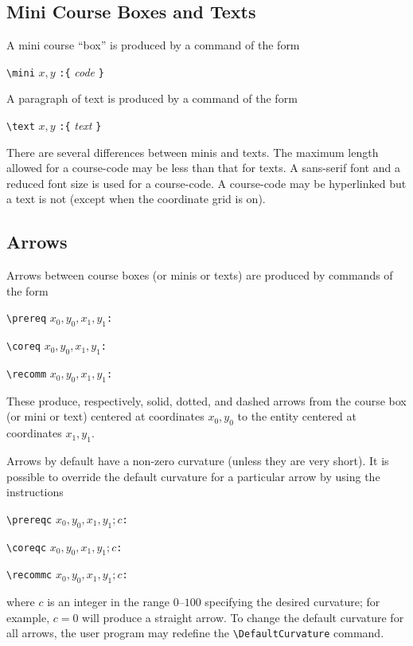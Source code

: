\documentclass[11pt]{article}
\begin{document}
\subsection{Mini Course Boxes and Texts}
A mini course ``box'' is produced by a command of the form
\begin{list}{}{}
\item \verb|\mini| $x,y$ \verb|:{| \emph{code} \verb|}|
\end{list}
A paragraph of text is produced by a command of the form
\begin{list}{}{}
\item \verb|\text| $x,y$ \verb|:{| \emph{text} \verb|}|
\end{list}
There are several differences between minis and texts.
The maximum length allowed for a course-code may be less than that
for texts. A sans-serif font and a reduced font size is
used for a course-code.  A course-code
may be hyperlinked but a text is not (except when the coordinate grid is on).


\subsection{Arrows}
Arrows between course boxes (or minis or texts) are produced
by commands of the form
\begin{list}{}{}
\item \verb|\prereq| $ x_0,y_0,x_1,y_1$\verb|:|
\item \verb|\coreq| $ x_0,y_0,x_1,y_1$\verb|:|
\item \verb|\recomm| $ x_0,y_0,x_1,y_1$\verb|:|
\end{list}
These produce, respectively, solid, dotted, and dashed arrows from
the course box (or mini or text) centered at coordinates
$x_0,y_0$
to the entity centered at coordinates
$x_1,y_1$.

Arrows by default have a
non-zero curvature (unless they are very short).  It is possible to override the default curvature 
for a particular arrow by using
the instructions
\begin{list}{}{}
\item \verb|\prereqc| $ x_0,y_0,x_1,y_1;c$\verb|:|
\item \verb|\coreqc| $ x_0,y_0,x_1,y_1;c$\verb|:|
\item \verb|\recommc| $ x_0,y_0,x_1,y_1;c$\verb|:|
\end{list}
where
$c$
is an integer in the range $0$--$100$ specifying the desired curvature; for example, 
$c= 0$
will produce a 
straight 
arrow. To change the default curvature for all arrows, the user program may redefine the
\verb|\DefaultCurvature|
command.
\end{document}

